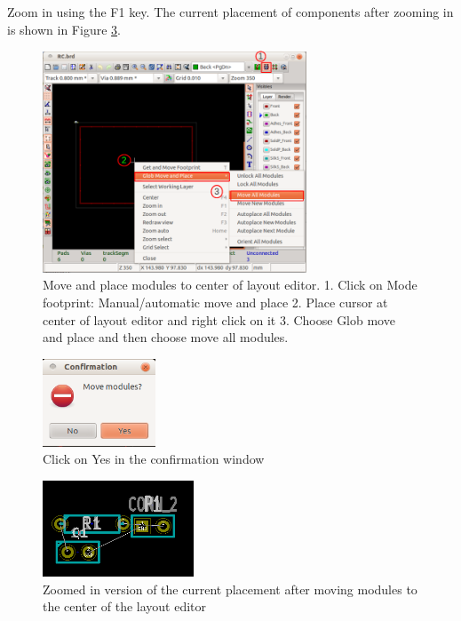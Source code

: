  Zoom in using the F1 key. The current placement of components after zooming in is shown in Figure \ref{curplace}.
\begin{figure}
\centering
\includegraphics[width=0.7\textwidth]{figures/movep}
\caption{Move and place modules to center of layout editor. 1. Click on Mode footprint: Manual/automatic move and place 2. Place cursor at center of layout editor and right click on it 3. Choose Glob move and place and then choose move all modules.}
\label{movep}
\end{figure}
\begin{figure}
\centering
\includegraphics[width=0.3\textwidth]{figures/confirm}
\caption{Click on Yes in the confirmation window}
\label{confirm}
\end{figure}
\begin{figure}
\centering
\includegraphics[width=0.4\textwidth]{figures/curplace}
\caption{Zoomed in version of the current placement after moving modules to the center of the layout editor}
\label{curplace}
\end{figure}

